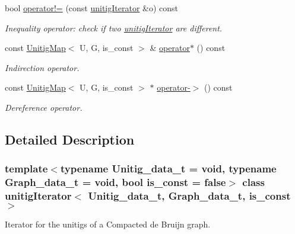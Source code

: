 \begin{DoxyCompactItemize}
bool \hyperlink{classunitigIterator_aead3edb7b33bdcbe9f5dd0e69714991e}{operator!=} (const \hyperlink{classunitigIterator}{unitig\+Iterator} \&o) const
\begin{DoxyCompactList}\small\item\em Inequality operator\+: check if two \hyperlink{classunitigIterator}{unitig\+Iterator} are different. \end{DoxyCompactList}\item 
const \hyperlink{classUnitigMap}{Unitig\+Map}$<$ U, G, is\+\_\+const $>$ \& \hyperlink{classunitigIterator_a6af9150a527c60d1bf81ed4352875372}{operator$\ast$} () const
\begin{DoxyCompactList}\small\item\em Indirection operator. \end{DoxyCompactList}\item 
const \hyperlink{classUnitigMap}{Unitig\+Map}$<$ U, G, is\+\_\+const $>$ $\ast$ \hyperlink{classunitigIterator_a5067c731a37401bb0a4fdedc31389d36}{operator-\/$>$} () const
\begin{DoxyCompactList}\small\item\em Dereference operator. \end{DoxyCompactList}\end{DoxyCompactItemize}


\subsection{Detailed Description}
\subsubsection*{template$<$typename Unitig\+\_\+data\+\_\+t = void, typename Graph\+\_\+data\+\_\+t = void, bool is\+\_\+const = false$>$\newline
class unitig\+Iterator$<$ Unitig\+\_\+data\+\_\+t, Graph\+\_\+data\+\_\+t, is\+\_\+const $>$}

Iterator for the unitigs of a Compacted de Bruijn graph. 

